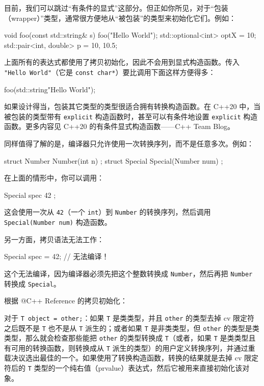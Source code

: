 目前，我们可以跳过“有条件的显式”这部分。但正如你所见，对于“包装（wrapper）”类型，通常很方便地从“被包装”的类型来初始化它们。例如：


\begin{codebox}[cpp]
void foo(const std::string& s) { }
foo("Hello World");
std::optional<int> optX = 10;
std::pair<int, double> p = { 10, 10.5};
\end{codebox}

上面所有的表达式都使用了拷贝初始化，因此不会用到显式构造函数。传入 \texttt{"Hello World"}（它是 \texttt{const char*}）要比调用下面这样方便得多：

\begin{codebox}[cpp]
foo(std::string{"Hello World"});
\end{codebox}

\begin{myInfoBox}
如果设计得当，包装其它类型的类型很适合拥有转换构造函数。在 C++20 中，当被包装的类型带有 \texttt{explicit} 构造函数时，甚至可以有条件地设置 \texttt{explicit} 构造函数。更多内容见 C++20 的有条件显式构造函数——C++ Team Blog。
\end{myInfoBox}

同样值得了解的是，编译器只允许使用一次转换序列，而不是任意多次。例如：

\begin{codebox}[cpp]
struct Number {
Number(int n) { }
};
struct Special {
Special(Number num) {}
};
\end{codebox}

在上面的情形中，你可以调用：

\begin{codebox}[cpp]
Special spec { 42 };
\end{codebox}

这会使用一次从 \texttt{42}（一个 \texttt{int}）到 \texttt{Number} 的转换序列，然后调用 \texttt{Special(Number num)} 构造函数。

另一方面，拷贝语法无法工作：


\begin{codebox}[cpp]
Special spec = 42; // 无法编译！
\end{codebox}

这个无法编译，因为编译器必须先把这个整数转换成 \texttt{Number}，然后再把 \texttt{Number} 转换成 \texttt{Special}。

根据 @C++ Reference 的拷贝初始化：

\begin{myQuote}
对于 \texttt{T object = other;}：如果 \texttt{T} 是类类型，并且 \texttt{other} 的类型去掉 cv 限定符之后既不是 \texttt{T} 也不是从 \texttt{T} 派生的；或者如果 \texttt{T} 是非类类型，但 \texttt{other} 的类型是类类型，那么就会检查那些能把 \texttt{other} 的类型转换成 \texttt{T}（或者，如果 \texttt{T} 是类类型且有可用的转换函数，则转换成从 \texttt{T} 派生的类型）的用户定义转换序列，并通过重载决议选出最佳的一个。如果使用了转换构造函数，转换的结果就是去掉 cv 限定符后的 \texttt{T} 类型的一个纯右值（prvalue）表达式，然后它被用来直接初始化该对象。
\end{myQuote}


